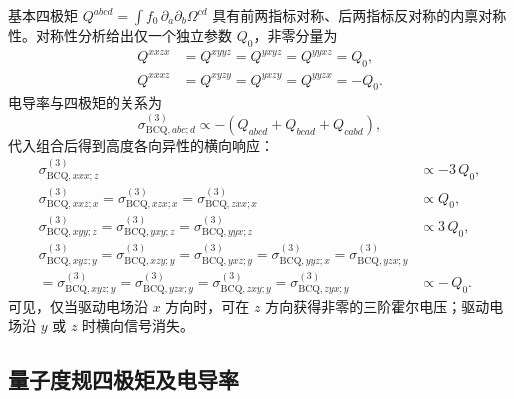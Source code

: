 基本四极矩 \(Q^{abcd} = \int f_0\,\partial_{a}\partial_{b}\Omega^{cd}\) 具有前两指标对称、后两指标反对称的内禀对称性。对称性分析给出仅一个独立参数 \(Q_{0}\)，非零分量为
\begin{equation}
\begin{aligned}
  Q^{xxzx} &= Q^{xyyz} = Q^{yxyz} = Q^{yyxz} = Q_{0},\\
  Q^{xxxz} &= Q^{xyzy} = Q^{yxzy} = Q^{yyzx} = -Q_{0}.
\end{aligned}
\end{equation}
电导率与四极矩的关系为
\begin{equation}
  \sigma^{(3)}_{\mathrm{BCQ}, abc;d} \propto -(Q_{abcd}+Q_{bcad}+Q_{cabd}),
\end{equation}
代入组合后得到高度各向异性的横向响应：
\begin{equation}
\begin{aligned}
  \sigma^{(3)}_{\mathrm{BCQ}, xxx;z} &\propto -3\,Q_{0},\\
  \sigma^{(3)}_{\mathrm{BCQ}, xxz;x}
  = \sigma^{(3)}_{\mathrm{BCQ}, xzx;x}
  = \sigma^{(3)}_{\mathrm{BCQ}, zxx;x} &\propto Q_{0},\\
  \sigma^{(3)}_{\mathrm{BCQ}, xyy;z}
  = \sigma^{(3)}_{\mathrm{BCQ}, yxy;z}
  = \sigma^{(3)}_{\mathrm{BCQ}, yyx;z} &\propto 3\,Q_{0},\\
  \sigma^{(3)}_{\mathrm{BCQ}, xyz;y}
  = \sigma^{(3)}_{\mathrm{BCQ}, xzy;y}
  = \sigma^{(3)}_{\mathrm{BCQ}, yxz;y}
  = \sigma^{(3)}_{\mathrm{BCQ}, yyz;x}
  = \sigma^{(3)}_{\mathrm{BCQ}, yzx;y} & \\
  = \sigma^{(3)}_{\mathrm{BCQ}, xyz;y}
  = \sigma^{(3)}_{\mathrm{BCQ}, yzx;y}
  = \sigma^{(3)}_{\mathrm{BCQ}, zxy;y}
  = \sigma^{(3)}_{\mathrm{BCQ}, zyx;y} &\propto -\,Q_{0}.
\end{aligned}
\end{equation}
可见，仅当驱动电场沿 \(x\) 方向时，可在 \(z\) 方向获得非零的三阶霍尔电压；驱动电场沿 \(y\) 或 \(z\) 时横向信号消失。

\subsection{量子度规四极矩及电导率}

